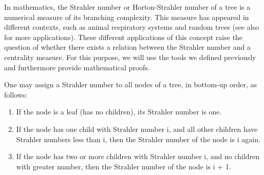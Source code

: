 

In mathematics, the Strahler number or Horton-Strahler number of a tree is a numerical measure of its branching complexity. This measure has appeared in different contexts, such as animal respiratory systems \cite{horsfield1976some} and random trees \cite{devroye1996horton} (see also~\cite{EsparzaLS14} for more applications). These different applications of this concept raise the question of whether there exists a relation between the Strahler number and a centrality measure. For this purpose, we will use the tools we defined previously and furthermore provide mathematical proofs.

One may assign a Strahler number to all nodes of a tree, in bottom-up order, as follows:
\begin{enumerate}
\item 
If the node is a leaf (has no children), its Strahler number is one.
\item
If the node has one child with Strahler number i, and all other children have Strahler numbers less than i, then the Strahler number of the node is i again.
\item
If the node has two or more children with Strahler number i, and no children with greater number, then the Strahler number of the node is i + 1.
\end{enumerate}


